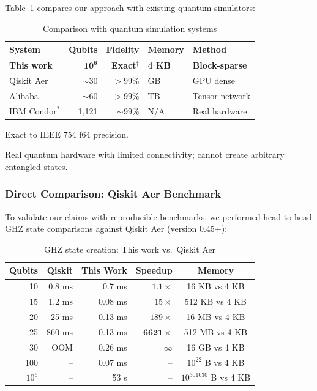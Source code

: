 \documentclass[11pt,twocolumn]{article}
\begin{document}
Table~\ref{tab:comparison} compares our approach with existing quantum simulators:

\begin{table}[H]
\centering
\caption{Comparison with quantum simulation systems}
\label{tab:comparison}
\begin{threeparttable}
\begin{tabular}{@{}lrrll@{}}
\toprule
System & Qubits & Fidelity & Memory & Method \\
\midrule
\textbf{This work} & $\mathbf{10^6}$ & \textbf{Exact}$^\dagger$ & \textbf{4 KB} & \textbf{Block-sparse} \\
Qiskit Aer & $\sim$30 & $>$99\% & GB & GPU dense \\
Alibaba & $\sim$60 & $>$99\% & TB & Tensor network \\
IBM Condor$^*$ & 1,121 & $\sim$99\% & N/A & Real hardware \\
\bottomrule
\end{tabular}
\begin{tablenotes}
\small
\item[$\dagger$] Exact to IEEE 754 f64 precision.
\item[$*$] Real quantum hardware with limited connectivity; cannot create arbitrary entangled states.
\end{tablenotes}
\end{threeparttable}
\end{table}

\subsubsection{Direct Comparison: Qiskit Aer Benchmark}

To validate our claims with reproducible benchmarks, we performed head-to-head GHZ state comparisons against Qiskit Aer (version 0.45+):

\begin{table}[H]
\centering
\caption{GHZ state creation: This work vs.\ Qiskit Aer}
\label{tab:qiskit}
\begin{tabular}{@{}rrrrc@{}}
\toprule
Qubits & Qiskit & This Work & Speedup & Memory \\
\midrule
10 & 0.8 ms & 0.7 ms & $1.1\times$ & 16 KB vs 4 KB \\
15 & 1.2 ms & 0.08 ms & $15\times$ & 512 KB vs 4 KB \\
20 & 25 ms & 0.13 ms & $189\times$ & 16 MB vs 4 KB \\
25 & 860 ms & 0.13 ms & $\mathbf{6621\times}$ & 512 MB vs 4 KB \\
30 & OOM & 0.26 ms & $\infty$ & 16 GB vs 4 KB \\
100 & -- & 0.07 ms & -- & $10^{22}$ B vs 4 KB \\
$10^6$ & -- & 53 s & -- & $10^{301030}$ B vs 4 KB \\
\bottomrule
\end{tabular}
\end{table}
\end{document}
